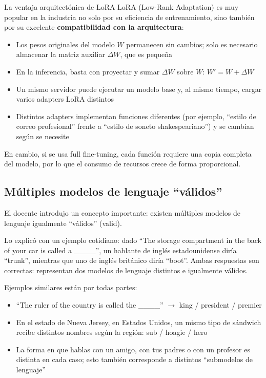 \begin{importantbox}{La ventaja arquitectónica de LoRA}
LoRA (Low-Rank Adaptation) es muy popular en la industria no solo por su eficiencia de entrenamiento, sino también por su excelente \textbf{compatibilidad con la arquitectura}:

\begin{itemize}
    \item Los pesos originales del modelo $W$ permanecen sin cambios; solo es necesario almacenar la matriz auxiliar $\Delta W$, que es pequeña
    \item En la inferencia, basta con proyectar y sumar $\Delta W$ sobre $W$: $W' = W + \Delta W$
    \item Un mismo servidor puede ejecutar un modelo base y, al mismo tiempo, cargar varios adapters LoRA distintos
    \item Distintos adapters implementan funciones diferentes (por ejemplo, ``estilo de correo profesional'' frente a ``estilo de soneto shakespeariano'') y se cambian según se necesite
\end{itemize}

En cambio, si se usa full fine-tuning, cada función requiere una copia completa del modelo, por lo que el consumo de recursos crece de forma proporcional.
\end{importantbox}

\subsection{Múltiples modelos de lenguaje ``válidos''}

El docente introdujo un concepto importante: existen múltiples modelos de lenguaje igualmente ``válidos'' (valid).

Lo explicó con un ejemplo cotidiano: dado ``The storage compartment in the back of your car is called a \_\_\_\_'', un hablante de inglés estadounidense diría ``trunk'', mientras que uno de inglés británico diría ``boot''. Ambas respuestas son correctas: representan dos modelos de lenguaje distintos e igualmente válidos.

Ejemplos similares están por todas partes:
\begin{itemize}
    \item ``The ruler of the country is called the \_\_\_\_'' $\rightarrow$ king / president / premier
    \item En el estado de Nueva Jersey, en Estados Unidos, un mismo tipo de sándwich recibe distintos nombres según la región: sub / hoagie / hero
    \item La forma en que hablas con un amigo, con tus padres o con un profesor es distinta en cada caso; esto también corresponde a distintos ``submodelos de lenguaje''
\end{itemize}

